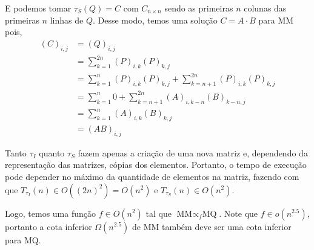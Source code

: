 E podemos tomar $\tau_S(Q) = C$ com $C_{n \times n}$ sendo as primeiras $n$ colunas das primeiras $n$ linhas de $Q$. Desse modo, temos uma solução $C = A \cdot B$ para MM pois,
\begin{align*}
    (C)_{i,j} &= (Q)_{i,j} \\
        &= \sum_{k = 1}^{2n} (P)_{i,k} (P)_{k,j} \\
        &= \sum_{k = 1}^{n} (P)_{i,k} (P)_{k,j} + \sum_{k = n + 1}^{2n} (P)_{i,k} (P)_{k,j} \\
        &= \sum_{k = 1}^{n} 0 + \sum_{k = n + 1}^{2 n} (A)_{i,k-n} (B)_{k-n,j} \\
        &= \sum_{k = 1}^{n} (A)_{i,k} (B)_{k,j} \\
        &= (A B)_{i,j}
\end{align*}

Tanto $\tau_I$ quanto $\tau_S$ fazem apenas a criação de uma nova matriz e, dependendo da representação das matrizes, cópias dos elementos. Portanto, o tempo de execução pode depender no máximo da quantidade de elementos na matriz, fazendo com que $T_{\tau_I}(n) \in O\left(\left(2n\right)^2\right) = O\left(n^2\right)$ e $T_{\tau_S}(n) \in O\left(n^2\right)$.

Logo, temos uma função $f \in O\left(n^2\right)$ tal que $\text{MM} \propto_f \text{MQ}$. Note que $f \in o\left(n^{2.5}\right)$, portanto a cota inferior $\Omega\left(n^{2.5}\right)$ de MM também deve ser uma cota inferior para MQ.
